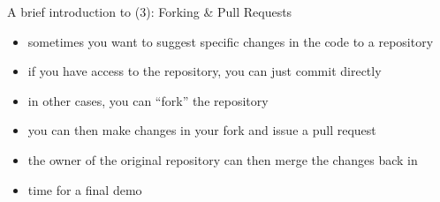 \begin{frame}{A brief introduction to \github (3): Forking \& Pull Requests}
  \begin{itemize}
    \item sometimes you want to suggest specific changes in the code to a repository
    \item if you have access to the repository, you can just commit directly
    \item in other cases, you can ``fork'' the repository
    \item you can then make changes in your fork and issue a pull request
    \item the owner of the original repository can then merge the changes back in
    \item time for a final demo
  \end{itemize}
\end{frame}